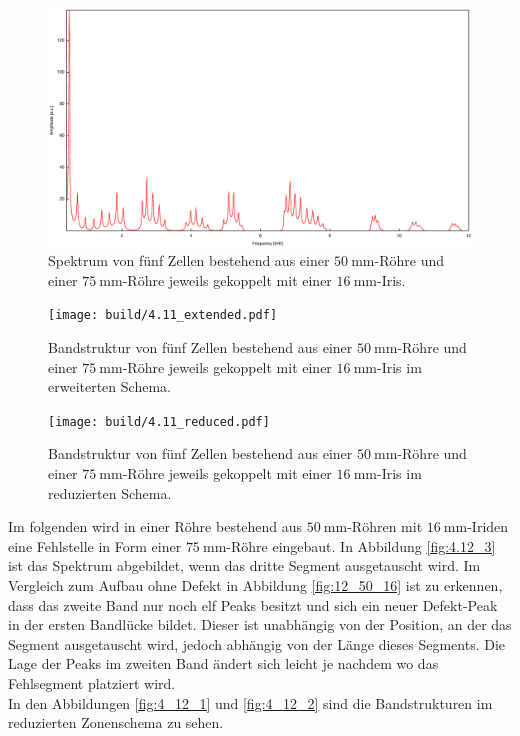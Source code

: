 \begin{figure}
\centering
\includegraphics[width=\linewidth-60pt,height=\textheight-60pt,keepaspectratio]{FP-V23data/4.11_625mm_50_16_75mm.eps}
\caption{Spektrum von fünf Zellen bestehend aus einer $\SI{50}{\milli\meter}$-Röhre und einer $\SI{75}{\milli\meter}$-Röhre jeweils gekoppelt mit einer $\SI{16}{\milli\meter}$-Iris.}
\label{fig:4.11}
\end{figure}

\begin{figure}
\centering
\texttt{[image: build/4.11\_extended.pdf]}
\caption{Bandstruktur von fünf Zellen bestehend aus einer $\SI{50}{\milli\meter}$-Röhre und einer $\SI{75}{\milli\meter}$-Röhre jeweils gekoppelt mit einer $\SI{16}{\milli\meter}$-Iris im erweiterten Schema.}
\label{fig:4_11_ext}
\end{figure}

\begin{figure}
\centering
\texttt{[image: build/4.11\_reduced.pdf]}
\caption{Bandstruktur von fünf Zellen bestehend aus einer $\SI{50}{\milli\meter}$-Röhre und einer $\SI{75}{\milli\meter}$-Röhre jeweils gekoppelt mit einer $\SI{16}{\milli\meter}$-Iris im reduzierten Schema.}
\label{fig:4_11_red}
\end{figure}

\newpage
\noindent Im folgenden wird in einer Röhre bestehend aus $\SI{50}{\milli\meter}$-Röhren mit $\SI{16}{\milli\meter}$-Iriden eine Fehlstelle in Form einer $\SI{75}{\milli\meter}$-Röhre eingebaut.
In Abbildung \ref{fig:4.12_3} ist das Spektrum abgebildet, wenn das dritte Segment ausgetauscht wird.
Im Vergleich zum Aufbau ohne Defekt in Abbildung \ref{fig:12_50_16} ist zu erkennen, dass das zweite Band nur noch elf Peaks besitzt und sich ein neuer Defekt-Peak in der ersten Bandlücke bildet. Dieser ist unabhängig von der Position, an der das Segment ausgetauscht wird, jedoch abhängig von der Länge dieses Segments. Die Lage der Peaks im zweiten Band ändert sich leicht je nachdem wo das Fehlsegment platziert wird.\\
In den Abbildungen \ref{fig:4_12_1} und \ref{fig:4_12_2} sind die Bandstrukturen im reduzierten Zonenschema zu sehen.


